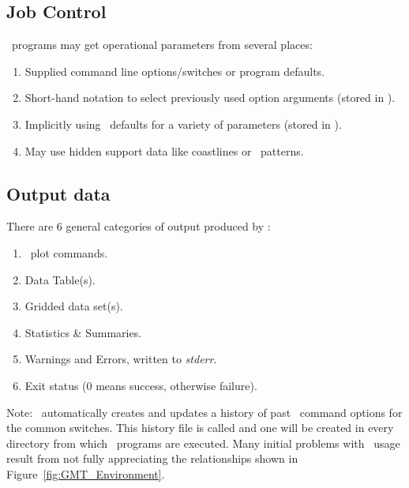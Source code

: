 \documentclass{report}
\begin{document}
\subsection{Job Control}

\GMT\ programs may get operational parameters from several places:

\begin{enumerate}

\item Supplied command line options/switches or program defaults.

\item Short-hand notation to select previously used option arguments
(stored in ).

\item Implicitly using \GMT\ defaults for a variety of parameters
(stored in ).

\item May use hidden support data like coastlines or \PS\ patterns.

\end{enumerate}

\subsection{Output data}
There are 6 general categories of output produced by \GMT:

\begin{enumerate}

\item \PS\ plot commands.

\item Data Table(s).

\item Gridded data set(s).

\item Statistics \& Summaries.

\item Warnings and Errors, written to {\it stderr}.

\item Exit status (0 means success, otherwise failure).

\end{enumerate}

Note: \GMT\ automatically creates and updates a history of past
\GMT\ command options for the common switches.  This history
file is called  and one will be created in
every directory from which \GMT\ programs are executed.  Many
initial problems with \GMT\ usage result from not fully appreciating
the relationships shown in Figure~\ref{fig:GMT_Environment}.
\end{document}
